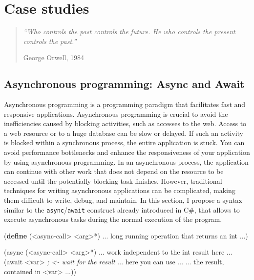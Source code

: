 \documentclass[12pt,a4paper,oneside,openright]{book}
\newenvironment{Shaded}{\begin{snugshade}}{\end{snugshade}}
\newcommand{\KeywordTok}[1]{\textcolor[rgb]{0.13,0.29,0.53}{\textbf{{#1}}}}
\newcommand{\CommentTok}[1]{\textcolor[rgb]{0.56,0.35,0.01}{\textit{{#1}}}}
\newcommand{\FunctionTok}[1]{\textcolor[rgb]{0.00,0.00,0.00}{{#1}}}
\newcommand{\NormalTok}[1]{{#1}}
\begin{document}
\chapter{Case studies}\label{case-studies}

\begin{quote}
\emph{``Who controls the past controls the future. He who controls the
present controls the past.''}

\begin{flushright}
George Orwell, 1984
\end{flushright}
\end{quote}

\section{Asynchronous programming: Async and
Await}\label{asynchronous-programming-async-and-await}

Asynchronous programming is a programming paradigm that facilitates fast
and responsive applications. Asynchronous programming is crucial to
avoid the inefficiencies caused by blocking activities, such as accesses
to the web. Access to a web resource or to a huge database can be slow
or delayed. If such an activity is blocked within a synchronous process,
the entire application is stuck. You can avoid performance bottlenecks
and enhance the responsiveness of your application by using asynchronous
programming. In an asynchronous process, the application can continue
with other work that does not depend on the resource to be accessed
until the potentially blocking task finishes. However, traditional
techniques for writing asynchronous applications can be complicated,
making them difficult to write, debug, and maintain. In this section, I
propose a syntax similar to the \texttt{async}/\texttt{await} construct
already introduced in C\#, that allows to execute asynchronous tasks
during the normal execution of the program.

\begin{Shaded}
\begin{Highlighting}[]
    \NormalTok{(}\KeywordTok{define}\FunctionTok{ }\NormalTok{(<async-call> <arg>*)}
      \NormalTok{... long running operation}
          \NormalTok{that returns an int ...)}

    \NormalTok{(async (<async-call> <arg>*)}
      \NormalTok{... work independent to the}
          \NormalTok{int result here  ...}
      \NormalTok{(await <var> }\CommentTok{; <- wait for the result}
        \NormalTok{... here you can use ...}
        \NormalTok{... the result, contained in <var> ...))}
\end{Highlighting}
\end{Shaded}
\end{document}
